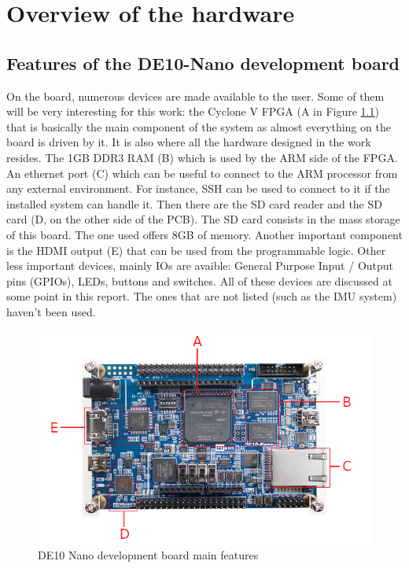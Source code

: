 \chapter{Overview of the hardware}

\section{Features of the DE10-Nano development board}

On the board, numerous devices are made available to the user. Some of them will be very 
interesting for this work: the Cyclone V FPGA (A in Figure \ref{fig:de10/de10_features}) that is
basically the main component of the system as almost everything on the board is driven by it. It is
also where all the hardware designed in the work resides. The 1GB DDR3 RAM (B) which is used 
by the ARM side of the FPGA. An ethernet port (C) which can be
useful to connect to the ARM processor from any external environment. For instance, SSH can be used
to connect to it if the installed system can handle it. Then there are the SD card reader and the SD 
card (D, on the other side of the PCB). The SD card consists in the mass storage of this board. The
one used offers 8GB of memory. Another important component is the HDMI output (E) that can be used
from the programmable logic. Other less important devices, mainly IOs are avaible: General Purpose 
Input / Output pins (GPIOs), LEDs, buttons and switches. All of these devices are discussed at some
point in this report. The ones that are not listed (such as the IMU system) haven't been used.

\begin{figure}[ht]
    \centering
    \includegraphics[scale=0.6]{Chapter1-Hardware/res/de10_nano.png}
    \caption{DE10 Nano development board main features}
    \label{fig:de10/de10_features}
\end{figure}

